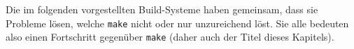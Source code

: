 Die im folgenden vorgestellten Build-Systeme haben gemeinsam, dass sie Probleme
lösen, welche \texttt{make} nicht oder nur unzureichend löst. Sie alle bedeuten
also einen Fortschritt gegenüber \texttt{make} (daher auch der Titel dieses
Kapitels).
